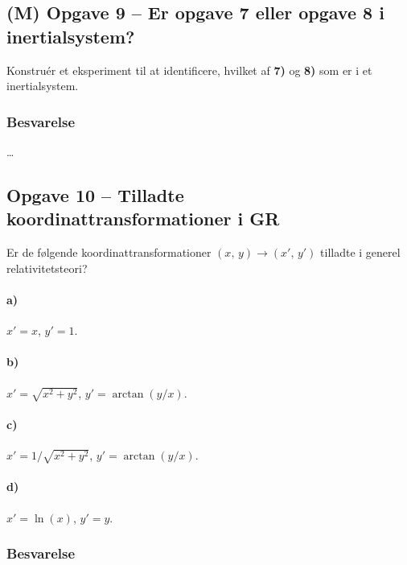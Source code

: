 \documentclass[../main.tex]{subfiles}
\begin{document}

\subsection{(M) Opgave 9 -- Er opgave 7 eller opgave 8 i inertialsystem?}
\setcounter{subsection}{9}
\setcounter{equation}{0}

Konstruér et eksperiment til at identificere, hvilket af \textbf{7)} og \textbf{8)} som er i et inertialsystem.


\subsubsection{Besvarelse}

\ldots




\subsection{Opgave 10 -- Tilladte koordinattransformationer i GR}
\setcounter{subsection}{10}
\setcounter{equation}{0}

Er de følgende koordinattransformationer $(x,\, y) \rightarrow (x',\, y')$ tilladte i generel relativitetsteori?
\paragraph{a)} $x' = x$, $y' = 1$.
\paragraph{b)} $x' = \sqrt{x^2 + y^2}$, $y' = \arctan(y/x)$.
\paragraph{c)} $x' = 1/\sqrt{x^2 + y^2}$, $y' = \arctan(y/x)$.
\paragraph{d)} $x' = \ln(x)$, $y' = y$.


\subsubsection*{Besvarelse}
\end{document}
